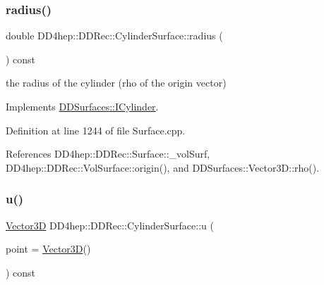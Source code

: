\hypertarget{class_d_d4hep_1_1_d_d_rec_1_1_cylinder_surface_a182ce2551b39f698df854755aa070066}{}\label{class_d_d4hep_1_1_d_d_rec_1_1_cylinder_surface_a182ce2551b39f698df854755aa070066} 
\subsubsection{\texorpdfstring{radius()}{radius()}}
{\footnotesize\ttfamily double D\+D4hep\+::\+D\+D\+Rec\+::\+Cylinder\+Surface\+::radius (\begin{DoxyParamCaption}{ }\end{DoxyParamCaption}) const\hspace{0.3cm}{\ttfamily [virtual]}}



the radius of the cylinder (rho of the origin vector) 



Implements \hyperlink{class_d_d_surfaces_1_1_i_cylinder_a66bc9b90cdb121938eff646b2fd21385}{D\+D\+Surfaces\+::\+I\+Cylinder}.



Definition at line 1244 of file Surface.\+cpp.



References D\+D4hep\+::\+D\+D\+Rec\+::\+Surface\+::\+\_\+vol\+Surf, D\+D4hep\+::\+D\+D\+Rec\+::\+Vol\+Surface\+::origin(), and D\+D\+Surfaces\+::\+Vector3\+D\+::rho().

\hypertarget{class_d_d4hep_1_1_d_d_rec_1_1_cylinder_surface_a8b45bcd7d1ca8b8de3d3e5b509988224}{}\label{class_d_d4hep_1_1_d_d_rec_1_1_cylinder_surface_a8b45bcd7d1ca8b8de3d3e5b509988224} 
\subsubsection{\texorpdfstring{u()}{u()}}
{\footnotesize\ttfamily \hyperlink{class_d_d_surfaces_1_1_vector3_d}{Vector3D} D\+D4hep\+::\+D\+D\+Rec\+::\+Cylinder\+Surface\+::u (\begin{DoxyParamCaption}\item[{const \hyperlink{class_d_d_surfaces_1_1_vector3_d}{Vector3D} \&}]{point = {\ttfamily \hyperlink{class_d_d_surfaces_1_1_vector3_d}{Vector3D}()} }\end{DoxyParamCaption}) const\hspace{0.3cm}{\ttfamily [virtual]}}

